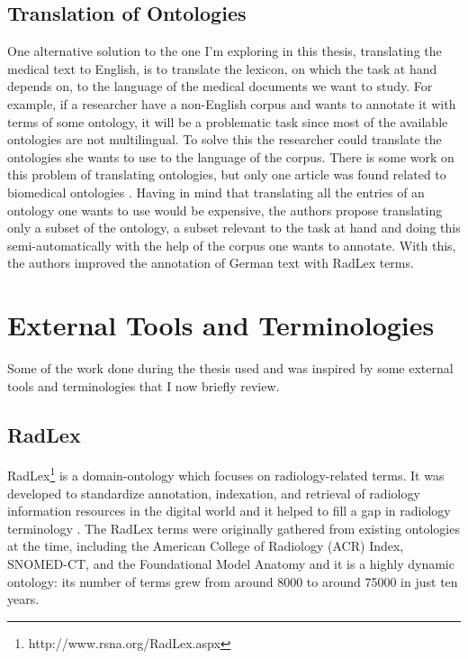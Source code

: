 \subsection{Translation of Ontologies}

One alternative solution to the one I'm exploring in this thesis, translating the medical text to English, is to translate the lexicon, on which the task at hand depends on, to the language of the medical documents we want to study. For example, if a researcher have a non-English corpus and wants to annotate it with terms of some ontology, it will be a problematic task since most of the available ontologies are not multilingual. To solve this the researcher could translate the ontologies she wants to use to the language of the corpus. There is some work on this problem of translating ontologies, but only one article was found related to biomedical ontologies \citep{Bretschneider}. Having in mind that translating all the entries of an ontology one wants to use would be expensive, the authors propose translating only a subset of the ontology, a subset relevant to the task at hand and doing this semi-automatically with the help of the corpus one wants to annotate. With this, the authors improved the annotation of German text with RadLex terms.

\section{External Tools and Terminologies}

Some of the work done during the thesis used and was inspired by some external tools and terminologies that I now briefly review.

\subsection{RadLex}

RadLex\footnote{http://www.rsna.org/RadLex.aspx} is a domain-ontology which focuses on radiology-related terms. It was developed to standardize annotation, indexation, and retrieval of radiology information resources in the digital world \citep{Langlotz2006} and it helped to fill a gap in radiology terminology \citep{Langlotz2002, Woods2013}. The RadLex terms were originally gathered from existing ontologies at the time, including the American College of Radiology (ACR) Index, SNOMED-CT, and the Foundational Model Anatomy and it is a highly dynamic ontology: its number of terms grew from around 8000 to around 75000 in just ten years.

